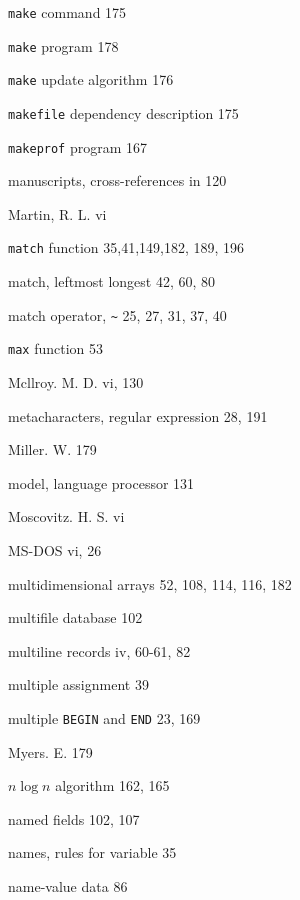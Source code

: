 \begin{multicols}{3}
\hangindent=4pc  \verb'make' command 175

\hangindent=4pc  \verb'make' program 178

\hangindent=4pc  \verb'make' update algorithm 176

\hangindent=4pc  \verb'makefile' dependency description 175

\hangindent=4pc  \verb'makeprof' program 167

\hangindent=4pc  manuscripts, cross-references in 120

\hangindent=4pc  Martin, R. L. vi

\hangindent=4pc  \verb'match' function 35,41,149,182, 189, 196

\hangindent=4pc  match, leftmost longest 42, 60, 80

\hangindent=4pc  match operator, \verb'~' 25, 27, 31, 37, 40

\hangindent=4pc  \verb'max' function 53

\hangindent=4pc  Mcllroy. M. D. vi, 130

\hangindent=4pc  metacharacters, regular expression 28, 191

\hangindent=4pc  Miller. W. 179

\hangindent=4pc  model, language processor 131

\hangindent=4pc  Moscovitz. H. S. vi

\hangindent=4pc  MS-DOS vi, 26

\hangindent=4pc  multidimensional arrays 52, 108, 114, 116, 182

\hangindent=4pc  multifile database 102

\hangindent=4pc  multiline records iv, 60-61, 82

\hangindent=4pc  multiple assignment 39

\hangindent=4pc  multiple \verb'BEGIN' and \verb'END' 23, 169

\hangindent=4pc  Myers. E. 179

\hangindent=4pc  $n \log n$ algorithm 162, 165

\hangindent=4pc  named fields 102, 107

\hangindent=4pc  names, rules for variable 35

\hangindent=4pc  name-value data 86


\end{multicols}
